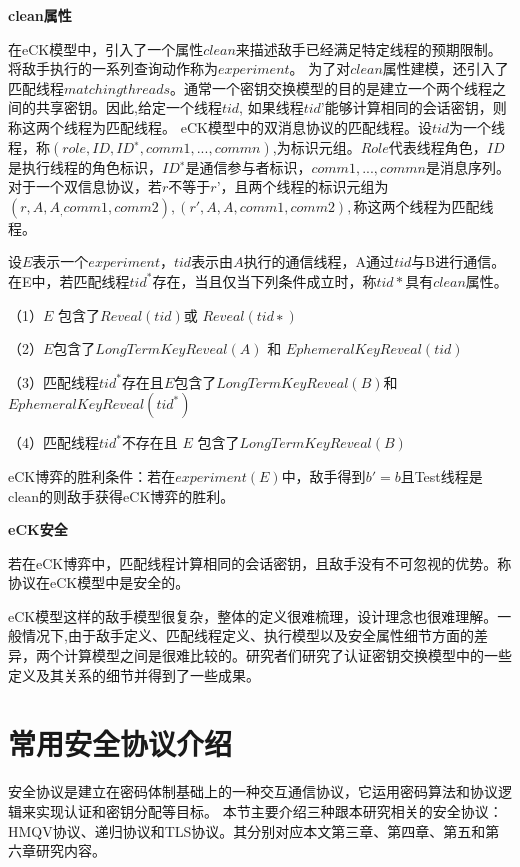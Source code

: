 \textbf{clean属性}

在eCK模型中，引入了一个属性$clean$来描述敌手已经满足特定线程的预期限制。将敌手执行的一系列查询动作称为$experiment$。
为了对$clean$属性建模，还引入了匹配线程$matching threads$。通常一个密钥交换模型的目的是建立一个两个线程之间的共享密钥。因此,给定一个线程$tid$, 如果线程$tid’$能够计算相同的会话密钥，则称这两个线程为匹配线程。
eCK模型中的双消息协议的匹配线程。设$tid$为一个线程，称$(role, ID, ID^∗,comm1, . . . ,commn)$,为标识元组。$Role$代表线程角色，$ID$是执行线程的角色标识，$ID^∗$是通信参与者标识，$comm1, . . . ,commn$是消息序列。对于一个双信息协议，若$r $不等于$ r’$，且两个线程的标识元组为$(r,A,A_,comm1,comm2), (r',A,A,comm1,comm2),$称这两个线程为匹配线程。



设$E$表示一个$experiment$，$tid$表示由$A$执行的通信线程，A通过$tid$与B进行通信。在E中，若匹配线程$tid^*$存在，当且仅当下列条件成立时，称$tid*$具有$clean$属性。

（1）$E$ 包含了$Reveal(tid) $或 $Reveal(tid∗)$

（2）$E $包含了$ LongTermKeyReveal(A)$ 和 $EphemeralKeyReveal(tid)$

（3）匹配线程$tid^*$存在且$E $包含了$ LongTermKeyReveal(B) $和$EphemeralKeyReveal(tid^*)$

（4）匹配线程$tid^*$不存在且 $E$ 包含了$LongTermKeyReveal(B)$

eCK博弈的胜利条件：若在$experiment(E)$中，敌手得到$b' = b$且Test线程是clean的则敌手获得eCK博弈的胜利。

\textbf{eCK安全}

若在eCK博弈中，匹配线程计算相同的会话密钥，且敌手没有不可忽视的优势。称协议在eCK模型中是安全的。


eCK模型这样的敌手模型很复杂，整体的定义很难梳理，设计理念也很难理解。一般情况下,由于敌手定义、匹配线程定义、执行模型以及安全属性细节方面的差异，两个计算模型之间是很难比较的。研究者们研究了认证密钥交换模型中的一些定义及其关系的细节并得到了一些成果\cite{RaymondChoo2006}\cite{Cremers2013}\cite{LaMacchia2007}。




\section{常用安全协议介绍}
安全协议是建立在密码体制基础上的一种交互通信协议，它运用密码算法和协议逻辑来实现认证和密钥分配等目标。
本节主要介绍三种跟本研究相关的安全协议：HMQV协议、递归协议和TLS协议。其分别对应本文第三章、第四章、第五和第六章研究内容。

